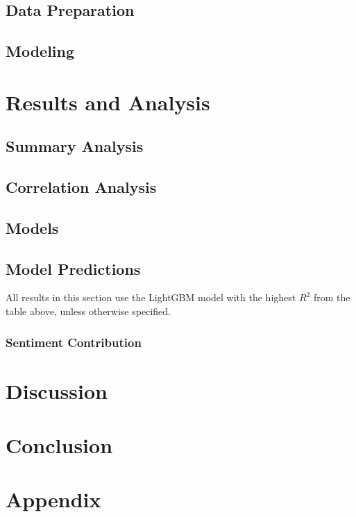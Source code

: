 \documentclass[12pt]{article}
\begin{document}
\subsection{Data Preparation}

\subsection{Modeling}

\section{Results and Analysis}
\label{section:results}
\subsection{Summary Analysis}

\subsection{Correlation Analysis}

\subsection{Models}

\subsection{Model Predictions}
All results in this section use the LightGBM model with the highest $R^2$ from the table above, unless otherwise specified.


\subsubsection{Sentiment Contribution}
\section{Discussion}
\label{section:discussion}

\section{Conclusion}
\label{section:conclusion}

\newpage
\newpage

\section{Appendix}
\end{document}
